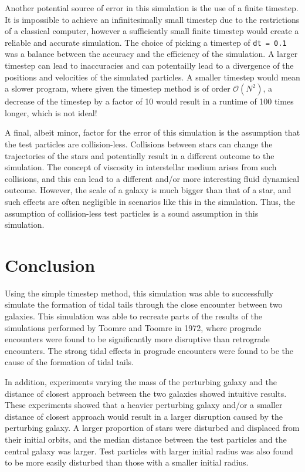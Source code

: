 \documentclass[twoside,twocolumn]{article}
\begin{document}
        Another potential source of error in this simulation is the use of a finite timestep. It is impossible to achieve an infinitesimally small timestep due to the restrictions of a classical computer, however a sufficiently small finite timestep would create a reliable and accurate simulation. The choice of picking a timestep of \texttt{dt = 0.1} was a balance between the accuracy and the efficiency of the simulation. A larger timestep can lead to inaccuracies and can potentailly lead to a divergence of the positions and velocities of the simulated particles. A smaller timestep would mean a slower program, where given the timestep method is of order $\mathcal{O}(N^2)$, a decrease of the timestep by a factor of 10 would result in a runtime of 100 times longer, which is not ideal!

        A final, albeit minor, factor for the error of this simulation is the assumption that the test particles are collision-less. Collisions between stars can change the trajectories of the stars and potentially result in a different outcome to the simulation. The concept of viscosity in interstellar medium arises from such collisions, and this can lead to a different and/or more interesting fluid dynamical outcome. However, the scale of a galaxy is much bigger than that of a star, and such effects are often negligible in scenarios like this in the simulation. Thus, the assumption of collision-less test particles is a sound assumption in this simulation. 

\section{Conclusion}

        Using the simple timestep method, this simulation was able to successfully simulate the formation of tidal tails through the close encounter between two galaxies. This simulation was able to recreate parts of the results of the simulations performed by Toomre and Toomre in 1972, where prograde encounters were found to be significantly more disruptive than retrograde encounters. The strong tidal effects in prograde encounters were found to be the cause of the formation of tidal tails.

        In addition, experiments varying the mass of the perturbing galaxy and the distance of closest approach between the two galaxies showed intuitive results. These experiments showed that a heavier perturbing galaxy and/or a smaller distance of closest approach would result in a larger disruption caused by the perturbing galaxy. A larger proportion of stars were disturbed and displaced from their initial orbits, and the median distance between the test particles and the central galaxy was larger. Test particles with larger initial radius was also found to be more easily disturbed than those with a smaller initial radius.  
\end{document}
